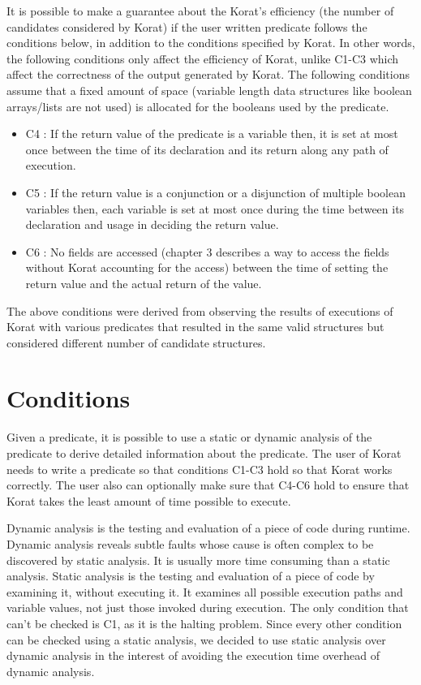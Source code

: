 \par
It is possible to make a guarantee about the Korat’s efficiency (the number of candidates considered by Korat) if the user written predicate follows the conditions below, in addition to the conditions specified by Korat. In other words, the following conditions only affect the efficiency of Korat, unlike C1-C3 which affect the correctness of the output generated by Korat. The following conditions assume that a fixed amount of space (variable length data structures like boolean arrays/lists are not used) is allocated for the booleans used by the predicate. 
\begin{itemize}
\item C4 : If the return value of the predicate is a variable then, it is set at most once between the time of its declaration and its return along any path of execution.
\item C5 : If the return value is a conjunction or a disjunction of multiple boolean variables then, each variable is set at most once during the time between its declaration and usage in deciding the return value.
\item C6 : No fields are accessed (chapter 3 describes a way to access the fields without Korat accounting for the access) between the time of setting the return value and the actual return of the value.
\end{itemize}

\par
The above conditions were derived from observing the results of executions of Korat with various predicates that resulted in the same valid structures but considered different number of candidate structures.

\section{Conditions}
Given a predicate, it is possible to use a static or dynamic analysis of the predicate to derive detailed information about the predicate. The user of Korat needs to write a predicate so that conditions C1-C3 hold so that Korat works correctly. The user also can optionally make sure that C4-C6 hold to ensure that Korat takes the least amount of time possible to execute. 

\par
Dynamic analysis is the testing and evaluation of a piece of code during runtime. Dynamic analysis reveals subtle faults whose cause is often complex to be discovered by static analysis. It is usually more time consuming than a static analysis. Static analysis is the testing and evaluation of a piece of code by examining it, without executing it. It examines all possible execution paths and variable values, not just those invoked during execution. The only condition that can’t be checked is C1, as it is the halting problem. Since every other condition can be checked using a static analysis, we decided to use static analysis over dynamic analysis in the interest of avoiding the execution time overhead of dynamic analysis.

